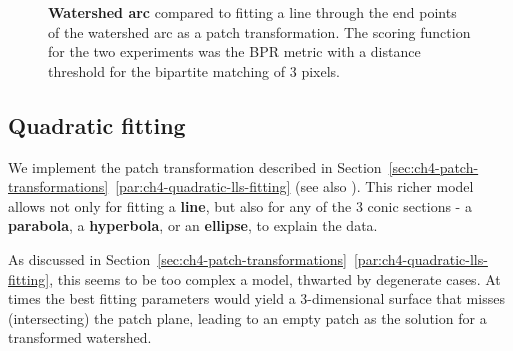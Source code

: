 \begin{figure}[t]
\centering
\caption[{\bf Watershed arc} compared to fitting a line as a patch transformation]%
{{\bf Watershed arc} compared to fitting a line through the end points of the watershed arc as a patch transformation. The scoring function for the two experiments was the BPR metric with a distance threshold for the bipartite matching of %
3 pixels.}
\label{fig:watershed-arc-experiment}
\end{figure}

\subsection{Quadratic fitting} %
\label{sec:ch5-quadratic-fitting}
We implement
the patch transformation described in Section~\ref*{sec:ch4-patch-transformations}~\ref{par:ch4-quadratic-lls-fitting} (see also ). This richer model allows not only for fitting a {\bf line}, but also for any of the 3 conic sections - a {\bf parabola}, a {\bf hyperbola}, or an {\bf ellipse}, to explain the data. 

As discussed in Section~\ref*{sec:ch4-patch-transformations}~\ref{par:ch4-quadratic-lls-fitting}, this seems to be too complex a model, thwarted by degenerate cases. At times the best fitting parameters would yield a 3-dimensional surface that 
misses (intersecting) the patch plane, 
leading to an empty patch as the solution for a transformed watershed.

